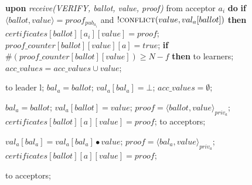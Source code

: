 \begin{algorithm}
\begin{algorithmic}[1]
		\State 
		\State \textbf{upon} \textit{receive(VERIFY, ballot, value, proof)} from acceptor $a_i$ \textbf{do}
		\State \hspace{\algorithmicindent} \textbf{if} $\langle ballot, value \rangle = proof_{pub_{a_i}}$ and $!\Call{conflict}{value,val_a[ballot]}$  \textbf{then}
		\State \hspace{\algorithmicindent}\hspace{\algorithmicindent} $certificates[ballot][a_i][value] = proof$;
		\State \hspace{\algorithmicindent}\hspace{\algorithmicindent} $proof\_counter[ballot][value][a] = true$;
		\State
		\State \hspace{\algorithmicindent} \textbf{if} $\#(proof\_counter[ballot][value]) \geq N-f$ \textbf{then}
		\State \hspace{\algorithmicindent}\hspace{\algorithmicindent}  to learners;
		\State \hspace{\algorithmicindent}\hspace{\algorithmicindent} $acc\_values = acc\_values \cup  value$;
			
		\State
		\State {} to leader l;
		\State $bal_a = ballot$;	
		\State $val_a[bal_a] = \bot$;	
		\State $acc\_values = \emptyset$;		
		\EndIf
		\EndFunction
	
		\State
		\State $bal_a = ballot$;
		\State $val_a[ballot] = value$;
		\State $proof = \langle ballot, value \rangle_{priv_a}$;
		\State $certificates[ballot][a][value] = proof$;
		\State {} to acceptors;
		\EndIf
		\EndFunction
		
		\State
		\If {$fast\_bal[]bal_a]$ and $!\Call{conflict}{value, val_a}$}
		\State $val_a[bal_a] =  val_a[bal_a] \bullet value$;
		\State $proof = \langle bal_a, value \rangle_{priv_a}$;
		\State $certificates[ballot][a][value] = proof$;

		\State {} to acceptors;
		\EndIf
		\EndFunction
	\end{algorithmic}
\end{algorithm}
